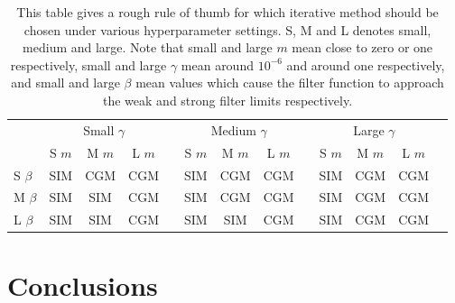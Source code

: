 \begin{table}[h]
    \centering
    \footnotesize
    \def\arraystretch{1.4}
    \begin{tabular}{@{}lcccccccccccc@{}}
    \toprule
    & \multicolumn{3}{c}{Small $\gamma$} & \phantom{a} & \multicolumn{3}{c}{Medium $\gamma$} & \phantom{a} & \multicolumn{3}{c}{Large $\gamma$} \\
    \cmidrule{2-4} \cmidrule{6-8} \cmidrule{10-12}
    & S $m$   & M $m$  & L $m$ &&  S $m$   & M $m$  & L $m$ && S $m$   & M $m$  & L $m$ & \\ \midrule \rule{0pt}{0.8cm}
    S $\beta$  & \colorbox{sim!25}{SIM} & \colorbox{cgm!25}{CGM} & \colorbox{cgm!25}{CGM} && \colorbox{sim!25}{SIM} & \colorbox{cgm!25}{CGM} & \colorbox{cgm!25}{CGM} &&  \colorbox{sim!25}{SIM} & \colorbox{cgm!25}{CGM} & \colorbox{cgm!25}{CGM}    \\ \rule{0pt}{6ex}
    M $\beta$ & \colorbox{sim!25}{SIM} & \colorbox{sim!25}{SIM} & \colorbox{cgm!25}{CGM} && \colorbox{sim!25}{SIM} & \colorbox{cgm!25}{CGM} & \colorbox{cgm!25}{CGM} &&  \colorbox{sim!25}{SIM} & \colorbox{cgm!25}{CGM} & \colorbox{cgm!25}{CGM}    \\ \rule{0pt}{6ex}
    L $\beta$  & \colorbox{sim!25}{SIM} & \colorbox{sim!25}{SIM} & \colorbox{cgm!25}{CGM} && \colorbox{sim!25}{SIM} & \colorbox{sim!25}{SIM} & \colorbox{cgm!25}{CGM} &&  \colorbox{sim!25}{SIM} & \colorbox{cgm!25}{CGM} & \colorbox{cgm!25}{CGM}   \\[0.5cm] \bottomrule 
    \end{tabular}
    \caption[Rules of thumb for iterative method choice under different hyperparameter settings]{This table gives a rough rule of thumb for which iterative method should be chosen under various hyperparameter settings. S, M and L denotes small, medium and large. Note that small and large $m$ mean close to zero or one respectively, small and large $\gamma$ mean around $10^{-6}$ and around one respectively, and small and large $\beta$ mean values which cause the filter function to approach the weak and strong filter limits respectively. }
    \label{tab:decision_SIM_CGM} 
\end{table}




 





\newpage 

\section{Conclusions}

